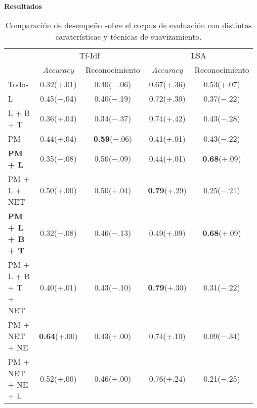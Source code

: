 \vspace{3 mm}
\textbf{Resultados}
\begin{table}[h]
\centering
\begin{tabular}{l c c | c c}
     & \multicolumn{2}{c|}{Tf-Idf} & \multicolumn{2}{c}{LSA}\\ [0.5ex]
     & \textit{Accuracy} & Reconocimiento & \textit{Accuracy} & Reconocimiento \\ [0.5ex]
    \hline
    Todos & 0.32(+.01) & 0.40($-$.06) & 0.67(+.36) & 0.53(+.07) \\[0.5ex]
    L & 0.45($-$.04) & 0.40($-$.19) & 0.72(+.30) & 0.37($-$.22) \\[0.5ex]
    L + B + T & 0.36(+.04) & 0.34($-$.37) & 0.74(+.42) & 0.43($-$.28) \\[0.5ex]
    PM & 0.44(+.04) & \textbf{0.59}($-$.06) & 0.41(+.01) & 0.43($-$.22) \\[0.5ex]
    \textbf{PM + L} & 0.35($-$.08) & 0.50($-$.09) & 0.44(+.01) & \textbf{0.68}(+.09) \\[0.5ex]
    PM + L + NET & 0.50(+.00) & 0.50(+.04) & \textbf{0.79}(+.29) & 0.25($-$.21)\\[0.5ex]
    \textbf{PM + L + B + T} & 0.32($-$.08) & 0.46($-$.13) & 0.49(+.09) & \textbf{0.68}(+.09) \\[0.5ex]
    PM + L + B + T + NET & 0.40(+.01) & 0.43($-$.10) & \textbf{0.79}(+.30) & 0.31($-$.22) \\[0.5ex]
    PM + NET + NE & \textbf{0.64}(+.00) & 0.43(+.00) & 0.74(+.10) & 0.09($-$.34) \\[0.5ex]
    PM + NET + NE + L & 0.52(+.00) & 0.46(+.00) & 0.76(+.24) & 0.21($-$.25) \\[0.5ex]
    \hline
\end{tabular}
\caption{Comparación de desempeño sobre el corpus de evaluación con distintas caraterísticas y técnicas de suavizamiento.}\label{tabla-exp4}
\end{table}

